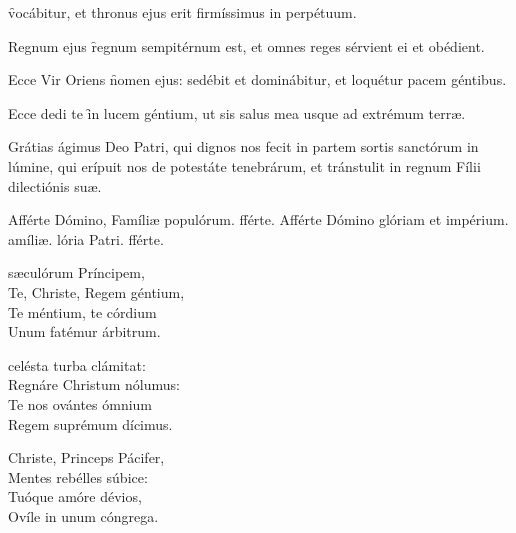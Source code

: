 \documentclass[fontsize=8pt,paper=A6,twoside,BCOR=1mm,DIV=22,headinclude]{scrarticle}
\begin{document}
\begin{multicols}{2}
\thispagestyle{empty}
{

\vspace{-.3em}


\vspace{-.5em}

 \f vocábitur, et thronus ejus erit firmíssimus in perpétuum. \DixitDominus

 Regnum ejus \f regnum sempitérnum est, et omnes reges sérvient ei et obédient.

 Ecce Vir Oriens \f nomen ejus: sedébit et dominábitur, et loquétur pacem géntibus.

 Ecce dedi te \f in lucem géntium, ut sis salus mea usque ad extrémum terræ.

 Grátias ágimus Deo Patri, qui dignos nos fecit in partem sortis sanctórum in lúmine, qui erípuit nos de potestáte tenebrárum, et tránstulit in regnum Fílii dilectiónis suæ.

\Rbr Afférte Dómino, \red{*} Famíliæ populórum.
fférte.
\V Afférte Dómino glóriam et impérium.
amíliæ.
lória Patri.
fférte.


\vspace{-.4em}

}

{
\begin{hymnus}
	 sæculórum Príncipem,\\
	\hspace{1.6em} Te, Christe, Regem géntium,\\
Te méntium, te córdium\\
Unum fatémur árbitrum.

celésta turba clámitat:\\
Regnáre Christum nólumus:\\
Te nos ovántes ómnium\\
Regem suprémum dícimus.

 Christe, Princeps Pácifer,\\
Mentes rebélles súbice:\\
Tuóque amóre dévios,\\
Ovíle in unum cóngrega.


\end{hymnus}}
\end{multicols}
\end{document}
